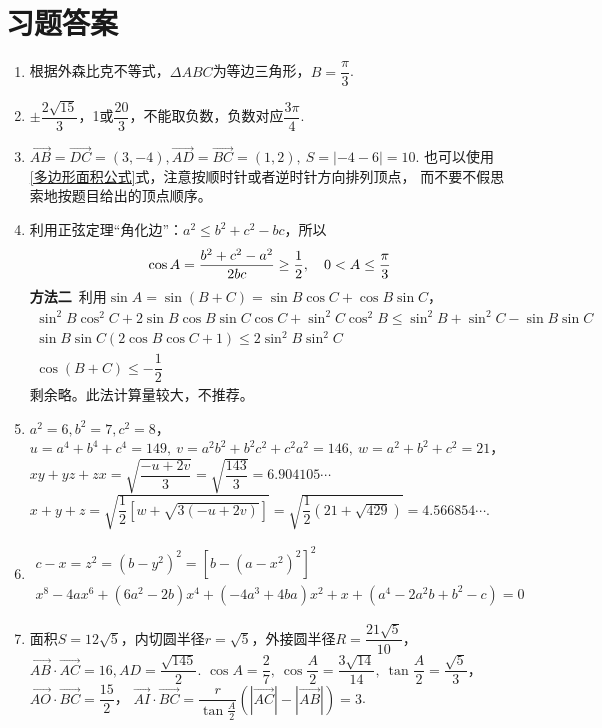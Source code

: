 \section{习题答案}
\begin{enumerate}[label={\textbf{\arabic*.}},leftmargin=
    \inteval{\myenumleftmargin}pt]
\item 
根据外森比克不等式，$ \Delta ABC $为等边三角形，$ B=\dfrac{\pi}{3} $. 

\item 
$ \pm\dfrac{2\sqrt{15}}{3} $，1或$ \dfrac{20}{3} $，不能取负数，负数对应$ \dfrac{3\pi}{4} $. 

\item 
$ \vec{AB}=\vec{DC}=(3,-4),
\vec{AD}=\vec{BC}=(1,2),\ S=|-4-6|=10 $. 也可以使用
\eqref{多边形面积公式}式，注意按顺时针或者逆时针方向排列顶点，
而不要不假思索地按题目给出的顶点顺序。

\item 利用正弦定理“角化边”：$ a^2\leq b^2+c^2-bc $，所以
\begin{gather*}
    \cos A=\dfrac{b^2+c^2-a^2}{2bc}\geq \dfrac{1}{2},
    \quad 0<A\leq \dfrac{\pi}{3}
\end{gather*}
\textbf{方法二}\ 利用$ \sin A=\sin(B+C)=\sin B\cos C+\cos B\sin C $，
\begin{gather*}
    \sin^2B\cos^2C+2\sin B\cos B\sin C\cos C+\sin^2C\cos^2B
    \leq \sin^2B+\sin^2C-\sin B\sin C \\
    \sin B\sin C(2\cos B\cos C+1)\leq 2\sin^2B \sin^2C \\
    \cos(B+C)\leq -\dfrac{1}{2} 
\end{gather*}
剩余略。此法计算量较大，不推荐。

\item 
$ a^2=6,b^2=7,c^2=8 $，\\
$ u=a^4+b^4+c^4=149,\ v=a^2b^2+b^2c^2+c^2a^2=146 ,\ w=a^2+b^2+c^2=21 $，\\
$ xy+yz+zx=\sqrt{\dfrac{-u+2v}{3}}=\sqrt{\dfrac{143}{3}}=6.904105\cdots $ \\
$ x+y+z=\sqrt{\dfrac{1}{2}[w+\sqrt{3(-u+2v)}]}=
\sqrt{\dfrac{1}{2}(21+\sqrt{429})}=4.566854\cdots $. 

\item 
\begin{gather*}
    c-x=z^2=(b-y^2)^2=[b-(a-x^2)^2]^2 \\
    x^8-4ax^6+(6a^2-2b)x^4+(-4a^3+4ba)x^2+x+(a^4-2a^2b+b^2-c)=0
\end{gather*} 

\item 
面积$ S=12\sqrt{5} $，内切圆半径$ r=\sqrt{5}$，外接圆半径$ R=\dfrac{21
    \sqrt{5}}{10} $，$ \vec{AB}\cdot \vec{AC} = 16,
AD=\dfrac{\sqrt{145}}{2} $. 
$ \cos A=\dfrac{2}{7},\ \cos\dfrac{A}{2}=\dfrac{3\sqrt{14}}{14},\ \tan\dfrac{A}{2}=
\dfrac{\sqrt{5}}{3} $，
$ \vec{AO}\cdot\vec{BC}=\dfrac{15}{2} $，
$ \vec{AI}\cdot\vec{BC}=\dfrac{r}{\tan \frac{A}{2}}
\left(|\vec{AC}|-|\vec{AB}|\right)=3 $. 


\end{enumerate}
